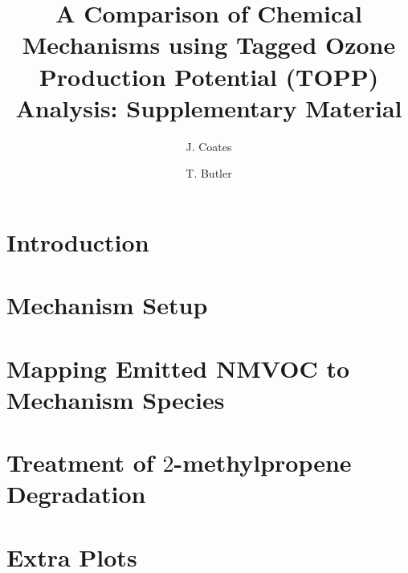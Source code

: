 \documentclass[11pt,a4paper]{article}
\title{A Comparison of Chemical Mechanisms using Tagged Ozone Production Potential (TOPP) Analysis: Supplementary Material}
\author[1]{J. Coates}%
\author[1]{T. Butler}
\affil[1]{Institute for Advanced Sustainability Studies, Potsdam, Germany}
\begin{document}
\maketitle
%
\section{Introduction} \label{s:introduction}

%
\section{Mechanism Setup} \label{s:mechanism}

%
\section{Mapping Emitted NMVOC to Mechanism Species}

\newpage
%
\section{Treatment of $2$-methylpropene Degradation}

\section{Extra Plots} \label{s:extra_plots}

%

 
\end{document}
